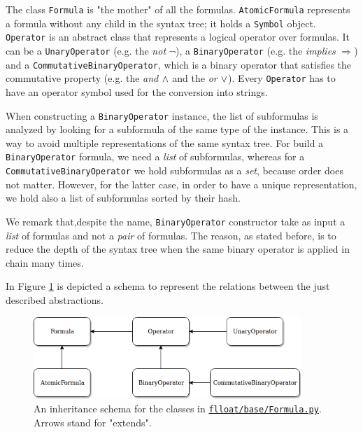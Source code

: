 The class \texttt{Formula} is "the mother" of all the formulas. \texttt{AtomicFormula} represents a formula without any child in the syntax tree; it holds a \texttt{Symbol} object. \texttt{Operator} is an abstract class that represents a logical operator over formulas. It can be a \texttt{UnaryOperator} (e.g. the \emph{not} $\lnot$), a \texttt{BinaryOperator} (e.g. the \emph{implies} $\Rightarrow$) and a \texttt{CommutativeBinaryOperator}, which is a binary operator that satisfies the commutative property (e.g. the \emph{and} $\wedge$ and the \emph{or} $\vee$). Every \texttt{Operator} has to have an operator symbol used for the conversion into strings. 

When constructing a \texttt{BinaryOperator} instance, the list of subformulas is analyzed by looking for a subformula of the same type of the instance. This is a way to avoid multiple representations of the same syntax tree. For build a \texttt{BinaryOperator} formula, we need a \emph{list} of subformulas, whereas for a \texttt{CommutativeBinaryOperator} we hold subformulas as a \emph{set}, because order does not matter. However, for the latter case, in order to have a unique representation, we hold also a list of subformulas sorted by their hash.

We remark that,despite the name, \texttt{BinaryOperator} constructor take as input a \emph{list} of formulas and not a \emph{pair} of formulas. The reason, as stated before, is to reduce the depth of the syntax tree when the same binary operator is applied in chain many times.

In Figure \ref{fig:formula-diagram} is depicted a schema to represent the relations between the just described abstractions.

\begin{figure}
	\centering
	\includegraphics[width=0.9\textwidth]{images/formula-diagram}
	\caption{An inheritance schema for the classes in \href{https://github.com/MarcoFavorito/flloat/blob/0.1.4/flloat/base/Formula.py}{\texttt{flloat/base/Formula.py}}. Arrows stand for "extends".}
	\label{fig:formula-diagram}
\end{figure}


